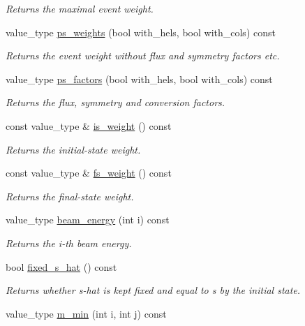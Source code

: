 \begin{DoxyCompactItemize}
\begin{DoxyCompactList}\small\item\em Returns the maximal event weight. \end{DoxyCompactList}\item 
value\+\_\+type \hyperlink{a00450_a6021d938f5d5a1d6e9d75c50a103da6c}{ps\+\_\+weights} (bool with\+\_\+hels, bool with\+\_\+cols) const 
\begin{DoxyCompactList}\small\item\em Returns the event weight without flux and symmetry factors etc. \end{DoxyCompactList}\item 
value\+\_\+type \hyperlink{a00450_a3df10808826029ddf5b92e9bc1d83004}{ps\+\_\+factors} (bool with\+\_\+hels, bool with\+\_\+cols) const 
\begin{DoxyCompactList}\small\item\em Returns the flux, symmetry and conversion factors. \end{DoxyCompactList}\item 
\hypertarget{a00450_a03d3bfe27e39d60c830d3673b067c904}{}const value\+\_\+type \& \hyperlink{a00450_a03d3bfe27e39d60c830d3673b067c904}{is\+\_\+weight} () const \label{a00450_a03d3bfe27e39d60c830d3673b067c904}

\begin{DoxyCompactList}\small\item\em Returns the initial-\/state weight. \end{DoxyCompactList}\item 
\hypertarget{a00450_a3deb84c93dfe91660dad8500204cd61d}{}const value\+\_\+type \& \hyperlink{a00450_a3deb84c93dfe91660dad8500204cd61d}{fs\+\_\+weight} () const \label{a00450_a3deb84c93dfe91660dad8500204cd61d}

\begin{DoxyCompactList}\small\item\em Returns the final-\/state weight. \end{DoxyCompactList}\item 
\hypertarget{a00450_a31b352c61bdd00a65bfbc541bd14d142}{}value\+\_\+type \hyperlink{a00450_a31b352c61bdd00a65bfbc541bd14d142}{beam\+\_\+energy} (int i) const \label{a00450_a31b352c61bdd00a65bfbc541bd14d142}

\begin{DoxyCompactList}\small\item\em Returns the i-\/th beam energy. \end{DoxyCompactList}\item 
bool \hyperlink{a00450_a4f9919668827c6de2cf110abdf7a7301}{fixed\+\_\+s\+\_\+hat} () const 
\begin{DoxyCompactList}\small\item\em Returns whether s-\/hat is kept fixed and equal to s by the initial state. \end{DoxyCompactList}\item 
\hypertarget{a00450_ab974219877f95adf4f0dbeb9dbb3615e}{}value\+\_\+type \hyperlink{a00450_ab974219877f95adf4f0dbeb9dbb3615e}{m\+\_\+min} (int i, int j) const \label{a00450_ab974219877f95adf4f0dbeb9dbb3615e}


\end{DoxyCompactItemize}
